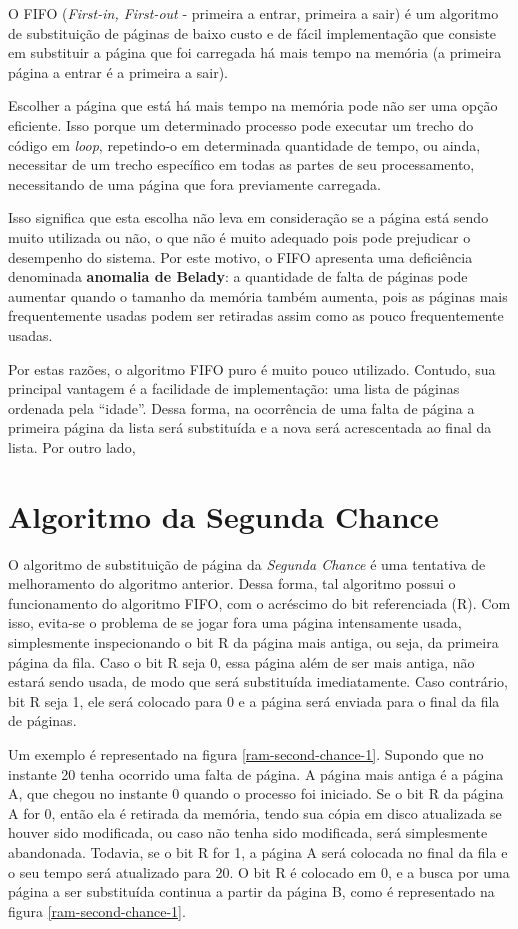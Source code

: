 O FIFO (\textit{First-in, First-out} - primeira a entrar, primeira a sair) é um algoritmo de substituição de páginas de baixo custo e de fácil implementação que consiste em substituir a página que foi carregada há mais tempo na memória (a primeira página a entrar é a primeira a sair).

Escolher a página que está há mais tempo na memória pode não ser uma opção eficiente. Isso porque um determinado processo pode executar um trecho do código em \textit{loop}, repetindo-o em determinada quantidade de tempo, ou ainda, necessitar de um trecho específico em todas as partes de seu processamento, necessitando de uma página que fora previamente carregada.

Isso significa que esta escolha não leva em consideração se a página está sendo muito utilizada ou não, o que não é muito adequado pois pode prejudicar o desempenho do sistema. Por este motivo, o FIFO apresenta uma deficiência denominada \textbf{anomalia de Belady}: a quantidade de falta de páginas pode aumentar quando o tamanho da memória também aumenta, pois as páginas mais frequentemente usadas podem ser retiradas assim como as pouco frequentemente usadas.

Por estas razões, o algoritmo FIFO puro é muito pouco utilizado. Contudo, sua principal vantagem é a facilidade de implementação: uma lista de páginas ordenada pela “idade”. Dessa forma, na ocorrência de uma falta de página a primeira página da lista será substituída e a nova será acrescentada ao final da lista. Por outro lado, 

\section{Algoritmo da Segunda Chance}

O algoritmo de substituição de página da \textit{Segunda Chance} é uma tentativa de melhoramento do algoritmo anterior. Dessa forma, tal algoritmo possui o funcionamento do algoritmo FIFO, com o acréscimo do bit referenciada (R). Com isso, evita-se o problema de se jogar fora uma página intensamente usada, simplesmente inspecionando o bit R da página mais antiga, ou seja, da primeira página da fila. Caso o bit R seja 0, essa página além de ser mais antiga, não estará sendo usada, de modo que será substituída imediatamente. Caso contrário, bit R seja 1, ele será colocado para 0 e a página será enviada para o final da fila de páginas. 

Um exemplo é representado na figura \ref{ram-second-chance-1}. Supondo que no instante 20 tenha ocorrido uma falta de página. A página mais antiga é a página A, que chegou no instante 0 quando o processo foi iniciado. Se o bit R da página A for 0, então ela é retirada da memória, tendo sua cópia em disco atualizada se houver sido modificada, ou caso não tenha sido modificada, será simplesmente abandonada. Todavia, se o bit R for 1, a página A será colocada no final da fila e o seu tempo será atualizado para 20. O bit R é colocado em 0, e a busca por uma página a ser substituída continua a partir da página B, como é representado na figura \ref{ram-second-chance-1}.

